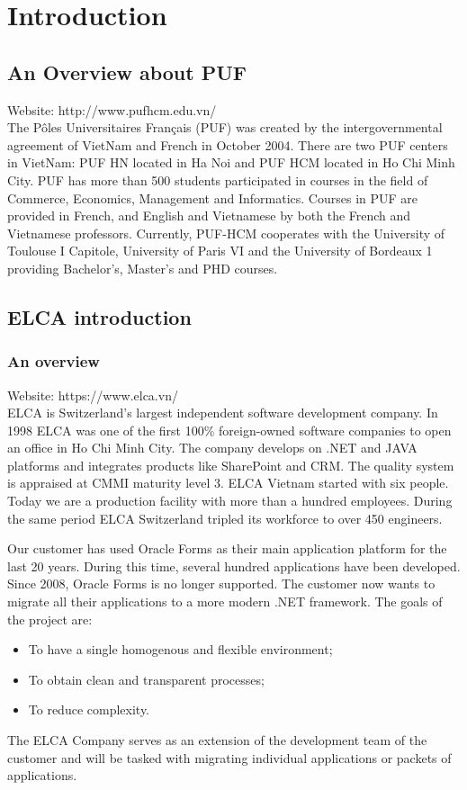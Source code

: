 \chapter{Introduction}

\section{An Overview about PUF}
Website: http://www.pufhcm.edu.vn/\\
The P\^{o}les Universitaires Fran\c{c}ais (PUF) was created by the intergovernmental agreement of VietNam and French in October 2004. There are two PUF centers in VietNam: PUF HN located in Ha Noi and PUF HCM located in Ho Chi Minh City. PUF has more than 500 students participated in courses in the field of Commerce, Economics, Management and Informatics. Courses in PUF are provided in French, and English and Vietnamese by both the French and Vietnamese professors.  Currently, PUF-HCM cooperates with the University of Toulouse I Capitole, University of Paris VI and the University of Bordeaux 1 providing Bachelor's, Master’s and PHD courses.
%

\section{ELCA introduction}
\subsection{An overview}
Website: https://www.elca.vn/\\
ELCA is Switzerland's largest independent software development company. In 1998 ELCA was one of the first 100\% foreign-owned software companies to open an office in Ho Chi Minh City. The company develops on .NET and JAVA platforms and integrates products like SharePoint and CRM. The quality system is appraised at CMMI maturity level 3. ELCA Vietnam started with six people. Today we are a production facility with more than a hundred employees. During the same period ELCA Switzerland tripled its workforce to over 450 engineers. 
\par
Our customer has used Oracle Forms as their main application platform for the last 20 years. During this time, several hundred applications have been developed. Since 2008, Oracle Forms is no longer supported. The customer now wants to migrate all their applications to a more modern .NET framework. The goals of the project are:
\begin{itemize}
	\item To have a single homogenous and flexible environment;
	\item To obtain clean and transparent processes;
	\item To reduce complexity.
\end{itemize}
\par
The ELCA Company serves as an extension of the development team of the customer and will be tasked with migrating individual applications or packets of applications.
%

